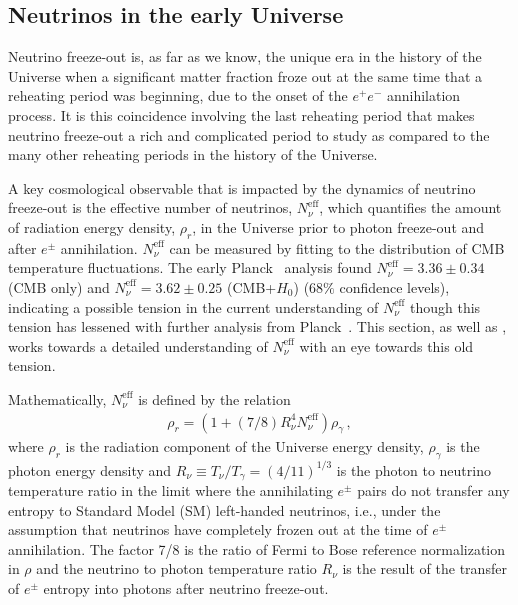 \subsection{Neutrinos in the early Universe}
\label{sec:model:ind}

Neutrino freeze-out is, as far as we know, the unique era in the history of the Universe when a significant matter fraction froze out at the same time that a reheating period was beginning, due to the onset of the $e^+e^-$ annihilation process. It is this coincidence involving the last reheating period that makes neutrino freeze-out a rich and complicated period to study as compared to the many other reheating periods in the history of the Universe.

A key cosmological observable that is impacted by the dynamics of neutrino freeze-out is the effective number of neutrinos, $N^{\text{eff}}_\nu$, which quantifies the amount of radiation energy density, $\rho_r$, in the Universe prior to photon freeze-out and after $e^\pm$ annihilation. $N^{\text{eff}}_\nu$ can be measured by fitting to the distribution of CMB temperature fluctuations. The early Planck~\cite{Planck:2013pxb} analysis found $N^{\text{eff}}_{\nu}=3.36\pm 0.34$ (CMB only) and $N^{\text{eff}}_{\nu}=3.62\pm 0.25$ (CMB+$H_0$) ($68\%$ confidence levels), indicating a possible tension in the current understanding of $N^{\text{eff}}_\nu$ though this tension has lessened with further analysis from Planck~\cite{Planck:2015fie,Planck:2018vyg}. This section, as well as , works towards a detailed understanding of $N^{\text{eff}}_{\nu}$ with an eye towards this old tension.

Mathematically, $N^{\text{eff}}_\nu$ is defined by the relation
\begin{align}\label{eq:NeffDef}
\rho_r=\left(1+(7/8)R_\nu^{4}N^{\text{eff}}_\nu\right)\rho_\gamma\,,
\end{align}
where $\rho_r$ is the radiation component of the Universe energy density, $\rho_\gamma$ is the photon energy density and $R_\nu\equiv T_\nu/T_\gamma=({4}/{11})^{1/3}$ is the photon to neutrino temperature ratio in the limit where the annihilating $e^\pm$ pairs do not transfer any entropy to Standard Model (SM) left-handed neutrinos, i.e., under the assumption that neutrinos have completely frozen out at the time of $e^\pm$ annihilation. The factor 7/8 is the ratio of Fermi to Bose reference normalization in $\rho$ and the neutrino to photon temperature ratio $R_\nu$ is the result of the transfer of $e^\pm$ entropy into photons after neutrino freeze-out. 

